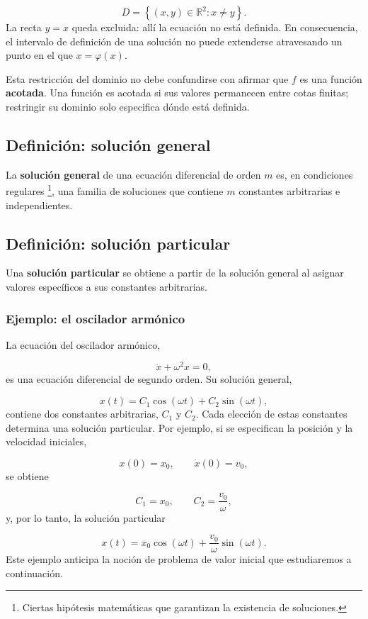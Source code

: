 \documentclass[12pt,a4paper]{article}
\begin{document}
	\[
	D=\left\{(x,y)\in\mathbb{R}^2:x\neq y\right\}.
	\]
	La recta \(y=x\) queda excluida: allí la ecuación no está definida. En consecuencia, el intervalo de definición de una solución no puede extenderse atravesando un punto en el que \(x=\varphi(x)\).
	
	Esta restricción del dominio no debe confundirse con afirmar que \(f\) es una función \textbf{acotada}. Una función es acotada si sus valores permanecen entre cotas finitas; restringir su dominio solo especifica dónde está definida.
	
	\subsection{Definición: solución general}
	
	La \textbf{solución general} de una ecuación diferencial de orden \(m\) es, en condiciones regulares \footnote{Ciertas hipótesis matemáticas que garantizan la existencia de soluciones.}, una familia de soluciones que contiene \(m\) constantes arbitrarias e independientes.
	
	\subsection{Definición: solución particular}
	
	Una \textbf{solución particular} se obtiene a partir de la solución general al asignar valores específicos a sus constantes arbitrarias.
	
	\subsubsection*{Ejemplo: el oscilador armónico}
	
	La ecuación del oscilador armónico,
	
	\[
	\ddot{x}+\omega^2x=0,
	\]
	es una ecuación diferencial de segundo orden. Su solución general,
	
	\[
	x(t)=C_1\cos(\omega t)+C_2\sin(\omega t),
	\]
	contiene dos constantes arbitrarias, \(C_1\) y \(C_2\). Cada elección de estas constantes determina una solución particular. Por ejemplo, si se especifican la posición y la velocidad iniciales,
	
	\[
	x(0)=x_0,
	\qquad
	\dot{x}(0)=v_0,
	\]
	se obtiene
	
	\[
	C_1=x_0,
	\qquad
	C_2=\frac{v_0}{\omega},
	\]
	y, por lo tanto, la solución particular
	
	\[
	x(t)=x_0\cos(\omega t)+\frac{v_0}{\omega}\sin(\omega t).
	\]
	Este ejemplo anticipa la noción de problema de valor inicial que estudiaremos a continuación.
	
\end{document}
